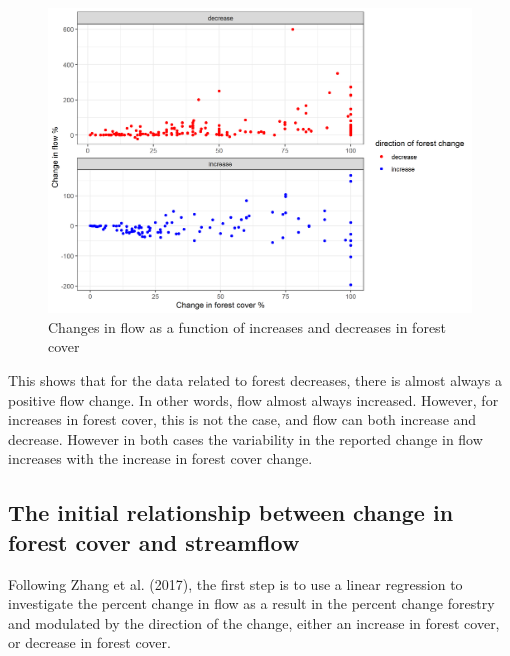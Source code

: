 \documentclass[]{elsarticle} %
\begin{document}
\begin{figure}
\includegraphics[width=0.9\linewidth]{Increase_decrease} \caption{Changes in flow as a function of increases and decreases in forest cover}\label{fig:increase_decrease}
\end{figure}

This shows that for the data related to forest decreases, there is
almost always a positive flow change. In other words, flow almost always
increased. However, for increases in forest cover, this is not the case,
and flow can both increase and decrease. However in both cases the
variability in the reported change in flow increases with the increase
in forest cover change.

\hypertarget{the-initial-relationship-between-change-in-forest-cover-and-streamflow}{%
\subsection{The initial relationship between change in forest cover and
streamflow}\label{the-initial-relationship-between-change-in-forest-cover-and-streamflow}}

Following Zhang et al. (2017), the first step is to use a linear
regression to investigate the percent change in flow as a result in the
percent change forestry and modulated by the direction of the change,
either an increase in forest cover, or decrease in forest cover.
\end{document}
